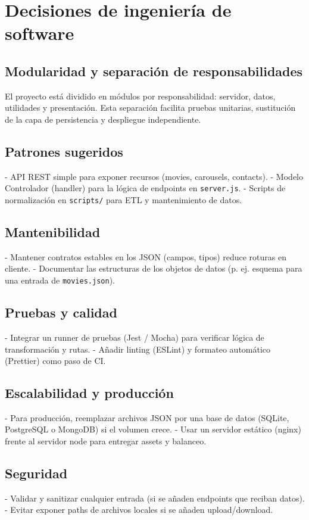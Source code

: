 \documentclass[11pt,a4paper]{article}
\begin{document}
\section{Decisiones de ingeniería de software}
\subsection{Modularidad y separación de responsabilidades}
El proyecto está dividido en módulos por responsabilidad: servidor, datos, utilidades y presentación. Esta separación facilita pruebas unitarias, sustitución de la capa de persistencia y despliegue independiente.

\subsection{Patrones sugeridos}
- API REST simple para exponer recursos (movies, carousels, contacts). 
- Modelo Controlador (handler) para la lógica de endpoints en \texttt{server.js}. 
- Scripts de normalización en \texttt{scripts/} para ETL y mantenimiento de datos.

\subsection{Mantenibilidad}
- Mantener contratos estables en los JSON (campos, tipos) reduce roturas en cliente.
- Documentar las estructuras de los objetos de datos (p. ej. esquema para una entrada de \texttt{movies.json}).

\subsection{Pruebas y calidad}
- Integrar un runner de pruebas (Jest / Mocha) para verificar lógica de transformación y rutas.
- Añadir linting (ESLint) y formateo automático (Prettier) como paso de CI.

\subsection{Escalabilidad y producción}
- Para producción, reemplazar archivos JSON por una base de datos (SQLite, PostgreSQL o MongoDB) si el volumen crece.
- Usar un servidor estático (nginx) frente al servidor node para entregar assets y balanceo.

\subsection{Seguridad}
- Validar y sanitizar cualquier entrada (si se añaden endpoints que reciban datos).
- Evitar exponer paths de archivos locales si se añaden upload/download.
\end{document}
